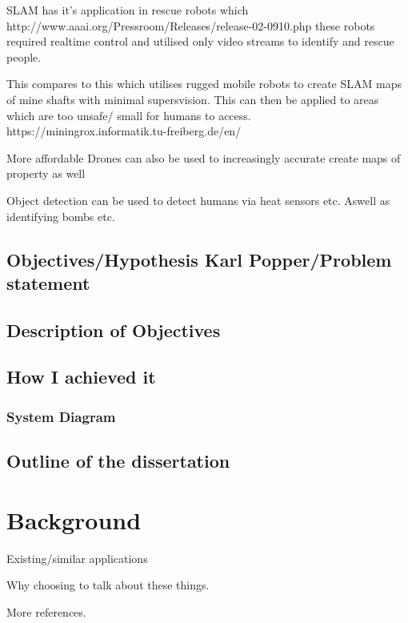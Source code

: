 \documentclass{mproj}
\begin{document}
SLAM has it's application in rescue robots which
http://www.aaai.org/Pressroom/Releases/release-02-0910.php
these robots required realtime control and utilised only video streams to identify and rescue people.

This compares to this which utilises rugged mobile robots to create SLAM maps of mine shafts with minimal supersvision. This can then be applied to areas which are too unsafe/ small for humans to access.
https://miningrox.informatik.tu-freiberg.de/en/

More affordable Drones can also be used to increasingly accurate create maps of property as well

Object detection can be used to detect humans via heat sensors etc. Aswell as identifying bombs etc.



\section{Objectives/Hypothesis Karl Popper/Problem statement}

\section{Description of Objectives}

\section{How I achieved it} 

\subsection{System Diagram} 

\section{Outline of the dissertation} 




\chapter{Background}\label{survey}

Existing/similar applications

Why choosing to talk about these things. 

More references.
\end{document}
